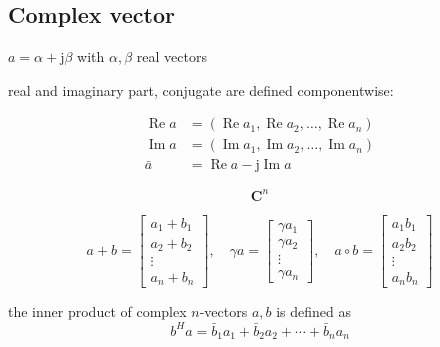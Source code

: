 \subsection{Complex vector}

\begin{definition}
    $ a=\alpha+\mathrm{j} \beta $ with $ \alpha, \beta $ real vectors
\end{definition}

\begin{definition}
    real and imaginary part, conjugate are defined componentwise:

$$
\begin{aligned}
\operatorname{Re} a &=\left(\operatorname{Re} a_{1}, \operatorname{Re} a_{2}, \ldots, \operatorname{Re} a_{n}\right) \\
\operatorname{Im} a &=\left(\operatorname{Im} a_{1}, \operatorname{Im} a_{2}, \ldots, \operatorname{Im} a_{n}\right) \\
\bar{a} &=\operatorname{Re} a-\mathrm{j} \operatorname{Im} a
\end{aligned}
$$
\end{definition}

\begin{definition}
    $$ \mathbf{C}^{n} $$
\end{definition}

\begin{definition}
    $$ a+b=\left[\begin{array}{c}a_{1}+b_{1} \\ a_{2}+b_{2} \\ \vdots \\ a_{n}+b_{n}\end{array}\right], \quad \gamma a=\left[\begin{array}{c}\gamma a_{1} \\ \gamma a_{2} \\ \vdots \\ \gamma a_{n}\end{array}\right], \quad a \circ b=\left[\begin{array}{c}a_{1} b_{1} \\ a_{2} b_{2} \\ \vdots \\ a_{n} b_{n}\end{array}\right] $$
\end{definition}

\begin{definition}
    the inner product of complex $ n $-vectors $ a, b $ is defined as
$$
b^{H} a=\bar{b}_{1} a_{1}+\bar{b}_{2} a_{2}+\cdots+\bar{b}_{n} a_{n}
$$
\end{definition}

